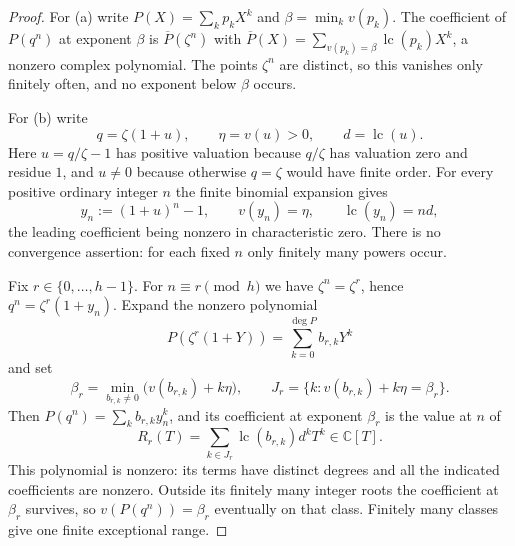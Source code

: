 \documentclass[11pt]{article}
\numberwithin{equation}{section}
\theoremstyle{definition}
\theoremstyle{remark}
\newcommand{\C}{\mathbb C}
\newcommand{\lc}{\operatorname{lc}}
\begin{document}
\begin{proof}
For (a) write $P(X)=\sum_kp_kX^k$ and $\beta=\min_kv(p_k)$. The coefficient of
$P(q^n)$ at exponent $\beta$ is $\overline P(\zeta^n)$ with
$\overline P(X)=\sum_{v(p_k)=\beta}\lc(p_k)X^k$, a nonzero complex polynomial.
The points $\zeta^n$ are distinct, so this vanishes only finitely often, and
no exponent below $\beta$ occurs.

For (b) write
\[
 q=\zeta(1+u),\qquad \eta=v(u)>0,\qquad d=\lc(u).
\]
Here $u=q/\zeta-1$ has positive valuation because $q/\zeta$ has valuation zero
and residue $1$, and $u\ne0$ because otherwise $q=\zeta$ would have finite
order. For every positive ordinary integer $n$ the finite binomial expansion
gives
\begin{equation}\label{hol:eq:yn}
 y_n:=(1+u)^n-1,\qquad v(y_n)=\eta,\qquad \lc(y_n)=nd,
\end{equation}
the leading coefficient being nonzero in characteristic zero. There is no
convergence assertion: for each fixed $n$ only finitely many powers occur.

Fix $r\in\{0,\ldots,h-1\}$. For $n\equiv r\pmod h$ we have $\zeta^n=\zeta^r$,
hence $q^n=\zeta^r(1+y_n)$. Expand the nonzero polynomial
\begin{equation}\label{hol:eq:unitexpand}
 P(\zeta^r(1+Y))=\sum_{k=0}^{\deg P}b_{r,k}Y^k
\end{equation}
and set
\begin{equation}\label{hol:eq:betar}
 \beta_r=\min_{b_{r,k}\ne0}\bigl(v(b_{r,k})+k\eta\bigr),
 \qquad J_r=\{k:v(b_{r,k})+k\eta=\beta_r\}.
\end{equation}
Then $P(q^n)=\sum_kb_{r,k}y_n^k$, and its coefficient at exponent $\beta_r$ is
the value at $n$ of
\begin{equation}\label{hol:eq:residuepoly}
 R_r(T)=\sum_{k\in J_r}\lc(b_{r,k})d^kT^k\in\C[T].
\end{equation}
This polynomial is nonzero: its terms have distinct degrees and all the
indicated coefficients are nonzero. Outside its finitely many integer roots
the coefficient at $\beta_r$ survives, so $v(P(q^n))=\beta_r$ eventually on
that class. Finitely many classes give one finite exceptional range.
\end{proof}
\end{document}

